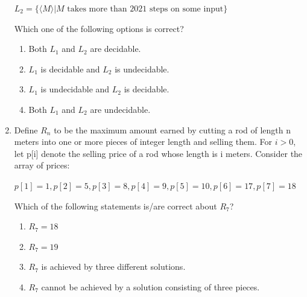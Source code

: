 \documentclass[a4paper, 11pt]{article}
\begin{document}
\begin{enumerate}
\begin{center}
    $L_2 = \{\langle M \rangle | M \text{ takes more than 2021 steps on some input}\}$ 
    \end{center}
    Which one of the following options is correct?
    \begin{enumerate}
        \item Both $L_1$ and $L_2$ are decidable.
        \item $L_1$ is decidable and $L_2$ is undecidable.
        \item $L_1$ is undecidable and $L_2$ is decidable.
        \item Both $L_1$ and $L_2$ are undecidable.
    \end{enumerate}
    \hfill{}
    \item Define $R_n$ to be the maximum amount earned by cutting a rod of length n meters into one or more pieces of integer length and selling them. For $i>0$, let p[i] denote the selling price of a rod whose length is i meters. Consider the array of prices:
    \begin{center}
    $p[1]=1, p[2]=5, p[3]=8, p[4]=9, p[5]=10, p[6]=17, p[7]=18$
    \end{center}    
    Which of the following statements is/are correct about $R_7$?
    \begin{enumerate}
        \item $R_7 = 18$
        \item $R_7 = 19$
        \item $R_7$ is achieved by three different solutions.
        \item $R_7$ cannot be achieved by a solution consisting of three pieces.
    \end{enumerate}
    \hfill{}
    

\end{enumerate}
\end{document}
